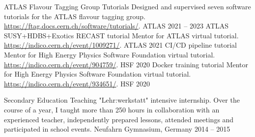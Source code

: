 \begin{cvhonors}
    \cvhonor
      {ATLAS Flavour Tagging Group Tutorials} %
      {Designed and supervised seven software tutorials for the ATLAS flavour tagging group. \href{Weblink}{https://ftag.docs.cern.ch/software/tutorials/}.} %
      {ATLAS} %
      {2021 -- 2023} %
    \cvhonor
      {ATLAS SUSY+HDBS+Exotics RECAST tutorial} %
      {Mentor for ATLAS virtual tutorial. \href{Indico agenda}{https://indico.cern.ch/event/1009271/}.} %
      {ATLAS} %
      {2021} %
    \cvhonor
      {CI/CD pipeline tutorial} %
      {Mentor for High Energy Physics Software Foundation virtual tutorial. \href{Indico agenda}{https://indico.cern.ch/event/904759/}.} %
      {HSF} %
      {2020} %
    \cvhonor
      {Docker training tutorial} %
      {Mentor for High Energy Physics Software Foundation virtual tutorial. \href{Indico agenda}{https://indico.cern.ch/event/934651/}.} %
      {HSF} %
      {2020} %

    \cvhonor
      {Secondary Education Teaching} %
      {"Lehr:werkstatt" intensive internship. Over the course of a year, I taught more than 250 hours in collaboration with an experienced teacher, independently prepared lessons, attended meetings and participated in school events.} %
      {Neufahrn Gymnasium, Germany} %
      {2014 -- 2015} %
\end{cvhonors}
